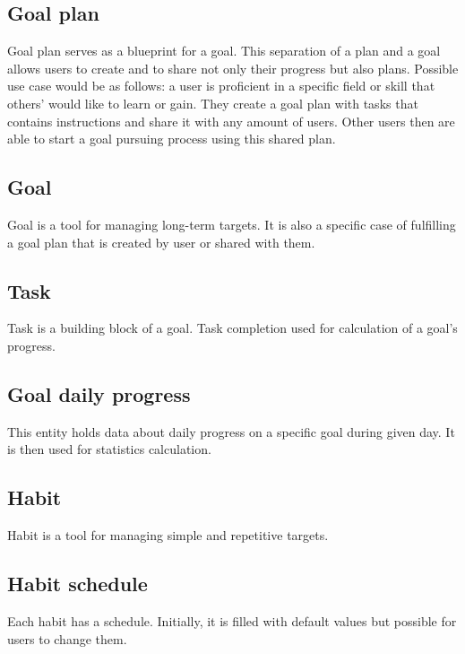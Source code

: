 \subsection{Goal plan}\label{subsec:goal-plan}

Goal plan serves as a blueprint for a goal.
This separation of a plan and a goal allows users to create and to share not only their progress but also plans.
Possible use case would be as follows: a user is proficient in a specific field or skill that others' would like to learn or gain.
They create a goal plan with tasks that contains instructions and share it with any amount of users.
Other users then are able to start a goal pursuing process using this shared plan.

\subsection{Goal}\label{subsec:goal}

Goal is a tool for managing long-term targets.
It is also a specific case of fulfilling a goal plan that is created by user or shared with them.

\subsection{Task}\label{subsec:task}

Task is a building block of a goal.
Task completion used for calculation of a goal's progress.

\subsection{Goal daily progress}\label{subsec:goal-daily-progess}

This entity holds data about daily progress on a specific goal during given day.
It is then used for statistics calculation.

\subsection{Habit}\label{subsec:habit}

Habit is a tool for managing simple and repetitive targets.

\subsection{Habit schedule}\label{subsec:habit-schedule}

Each habit has a schedule.
Initially, it is filled with default values but possible for users to change them.

